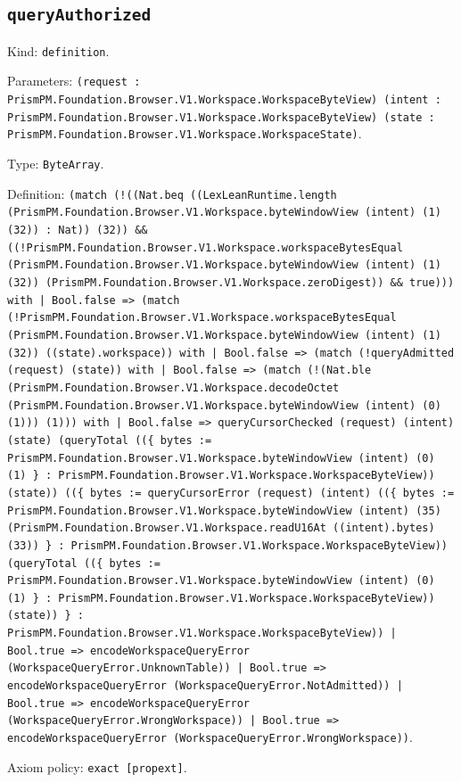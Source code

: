 \documentclass[11pt]{article}
\begin{document}
\subsection*{\texttt{queryAuthorized}}
\noindent Kind: \texttt{definition}.\par
\noindent Parameters: \texttt{(request : PrismPM.Foundation.Browser.V1.Workspace.WorkspaceByteView) (intent : PrismPM.Foundation.Browser.V1.Workspace.WorkspaceByteView) (state : PrismPM.Foundation.Browser.V1.Workspace.WorkspaceState)}.\par
\noindent Type: \texttt{ByteArray}.\par
\noindent Definition: \texttt{(match (!((Nat.beq ((LexLeanRuntime.length (PrismPM.Foundation.Browser.V1.Workspace.byteWindowView (intent) (1) (32)) : Nat)) (32)) \&\& ((!PrismPM.Foundation.Browser.V1.Workspace.workspaceBytesEqual (PrismPM.Foundation.Browser.V1.Workspace.byteWindowView (intent) (1) (32)) (PrismPM.Foundation.Browser.V1.Workspace.zeroDigest)) \&\& true))) with | Bool.false => (match (!PrismPM.Foundation.Browser.V1.Workspace.workspaceBytesEqual (PrismPM.Foundation.Browser.V1.Workspace.byteWindowView (intent) (1) (32)) ((state).workspace)) with | Bool.false => (match (!queryAdmitted (request) (state)) with | Bool.false => (match (!(Nat.ble (PrismPM.Foundation.Browser.V1.Workspace.decodeOctet (PrismPM.Foundation.Browser.V1.Workspace.byteWindowView (intent) (0) (1))) (1))) with | Bool.false => queryCursorChecked (request) (intent) (state) (queryTotal ((\{ bytes := PrismPM.Foundation.Browser.V1.Workspace.byteWindowView (intent) (0) (1) \} : PrismPM.Foundation.Browser.V1.Workspace.WorkspaceByteView)) (state)) ((\{ bytes := queryCursorError (request) (intent) ((\{ bytes := PrismPM.Foundation.Browser.V1.Workspace.byteWindowView (intent) (35) (PrismPM.Foundation.Browser.V1.Workspace.readU16At ((intent).bytes) (33)) \} : PrismPM.Foundation.Browser.V1.Workspace.WorkspaceByteView)) (queryTotal ((\{ bytes := PrismPM.Foundation.Browser.V1.Workspace.byteWindowView (intent) (0) (1) \} : PrismPM.Foundation.Browser.V1.Workspace.WorkspaceByteView)) (state)) \} : PrismPM.Foundation.Browser.V1.Workspace.WorkspaceByteView)) | Bool.true => encodeWorkspaceQueryError (WorkspaceQueryError.UnknownTable)) | Bool.true => encodeWorkspaceQueryError (WorkspaceQueryError.NotAdmitted)) | Bool.true => encodeWorkspaceQueryError (WorkspaceQueryError.WrongWorkspace)) | Bool.true => encodeWorkspaceQueryError (WorkspaceQueryError.WrongWorkspace))}.\par
\noindent Axiom policy: \texttt{exact [propext]}.\par
\end{document}
